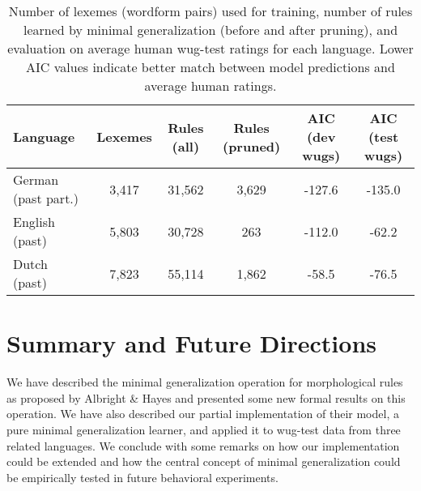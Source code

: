 \documentclass[11pt]{article}
\begin{document}
\begin{table*}
  \centering
  \begin{tabular}{l c c c c c}
    \hline
    Language  & Lexemes & Rules (all) & Rules (pruned) & 
    AIC (dev wugs) & AIC (test wugs) \\
    \hline
    German (past part.) & 3,417 & 31,562 & 3,629 & -127.6 & -135.0\\
    English (past) & 5,803 & 30,728 & 263 & -112.0 & -62.2\\
    Dutch (past) & 7,823 & 55,114 & 1,862 & -58.5 & -76.5\\
    \hline
  \end{tabular}
\caption{\label{results}Number of lexemes (wordform pairs) used for training, number of rules learned by minimal generalization (before and after pruning), and evaluation on average human wug-test ratings for each language. Lower AIC values indicate better match between model predictions and average human ratings.}
\end{table*}






\section{Summary and Future Directions}
\label{sec:summary}

We have described the minimal generalization operation for morphological rules as proposed by Albright \& Hayes and presented some new formal results on this operation. We have also described our partial implementation of their model, a pure minimal generalization learner, and applied it to wug-test data from three related languages. We conclude with some remarks on how our implementation could be extended and how the central concept of minimal generalization could be empirically tested in future behavioral experiments.
\end{document}
